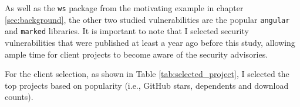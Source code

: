 \vspace{3mm}
\begin{table}[ht]
\centering
\hspace*{-2cm}
\caption{Summary of the three Selected Vulnerable Dependencies}
\label{tab:vulnerability}
\end{table}

As well as the \texttt{ws} package from the motivating example in chapter \ref{sec:background}, the other two studied vulnerabilities are the popular \texttt{angular} and \texttt{marked} libraries.
It is important to note that I selected security vulnerabilities that were published at least a year ago before this study, allowing ample time for client projects to become aware of the security advisories.

For the client selection, as shown in Table \ref{tab:selected_project}, I selected the top projects based on popularity (i.e., GitHub stars, dependents and download counts).

